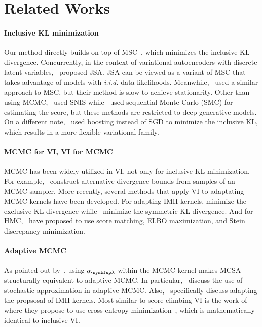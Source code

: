 \vspace{-0.1in}
\section{Related Works}\label{section:related}
\vspace{-0.05in}
\paragraph{Inclusive KL minimization}
Our method directly builds on top of MSC~\citep{NEURIPS2020_b2070693}, which minimizes the inclusive KL divergence.
Concurrently, in the context of variational autoencoders with discrete latent variables,~\citet{pmlr-v124-ou20a} proposed JSA.
JSA can be viewed as a variant of MSC that takes advantage of models with \textit{i.i.d.} data likelihoods.
Meanwhile,~\citet{li_approximate_2017} used a similar approach to MSC, but their method is slow to achieve stationarity.
Other than using MCMC,~\citet{DBLP:journals/corr/BornscheinB14,le_revisiting_2019} used SNIS while~\citet{pmlr-v119-wu20h} used sequential Monte Carlo (SMC) for estimating the score, but these methods are restricted to deep generative models.
On a different note,~\citet{pmlr-v161-jerfel21a} used boosting instead of SGD to minimize the inclusive KL, which results in a more flexible variational family.

\vspace{-0.1in}
\paragraph{MCMC for VI, VI for MCMC}
MCMC has been widely utilized in VI, not only for inclusive KL minimization.
For example,~\citet{pmlr-v37-salimans15, pmlr-v97-ruiz19a} construct alternative divergence bounds from samples of an MCMC sampler.
More recently, several methods that apply VI to adaptating MCMC kernels have been developed.
For adapting IMH kernels, \citet{habib2018auxiliary} minimize the exclusive KL divergence while~\cite{neklyudov_metropolishastings_2019} minimize the symmetric KL divergence.
And for HMC,~\citet{zhang_variational_2018, pmlr-v139-campbell21a} have proposed to use score matching, ELBO maximization, and Stein discrepancy minimization.

\vspace{-0.1in}
\paragraph{Adaptive MCMC}
As pointed out by~\citet{pmlr-v124-ou20a}, using \(q_{\vlambda}\) within the MCMC kernel makes MCSA structurally equivalent to adaptive MCMC.
In particular,~\citet{10.1007/s11222-008-9110-y, garthwaite_adaptive_2016} discuss the use of stochastic approximation in adaptive MCMC.
Also,~\citet{andrieu_ergodicity_2006, keith_adaptive_2008, holden_adaptive_2009, giordani_adaptive_2010} specifically discuss adapting the propsosal of IMH kernels.
Most similar to score climbing VI is the work of~\citet{keith_adaptive_2008} where they propose to use cross-entropy minimization~\citep{barbakh_cross_2009}, which is mathematically identical to inclusive VI.


